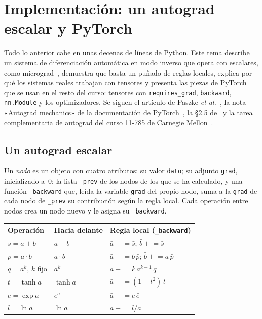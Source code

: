 \chapter{Implementación: un autograd escalar y PyTorch}
\label{tema:6}

Todo lo anterior cabe en unas decenas de líneas de Python. Este tema describe un sistema de diferenciación automática en modo inverso que opera con escalares, como micrograd~\cite{karpathy}, demuestra que basta un puñado de reglas locales, explica por qué los sistemas reales trabajan con tensores y presenta las piezas de PyTorch que se usan en el resto del curso: tensores con \texttt{requires\_grad}, \texttt{backward}, \texttt{nn.Module} y los optimizadores. Se siguen el artículo de Paszke \emph{et al.}~\cite{paszke}, la nota «Autograd mechanics» de la documentación de PyTorch~\cite{pytorch}, la §2.5 de~\cite{d2l} y la tarea complementaria de autograd del curso 11-785 de Carnegie Mellon~\cite{cmu11785}.

\section{Un autograd escalar}

\begin{definicion}\label{def:valor}
Un \emph{nodo} es un objeto con cuatro atributos: su valor \texttt{dato}; su adjunto \texttt{grad}, inicializado a~0; la lista \texttt{\_prev} de los nodos de los que se ha calculado, y una función \texttt{\_backward} que, leída la variable \texttt{grad} del propio nodo, suma a la \texttt{grad} de cada nodo de \texttt{\_prev} su contribución según la regla local. Cada operación entre nodos crea un nodo nuevo y le asigna su \texttt{\_backward}.
\end{definicion}

\begin{center}\small
\begin{tabular}{@{}lll@{}}
\toprule
Operación & Hacia delante & Regla local (\texttt{\_backward}) \\
\midrule
$s=a+b$ & $a+b$ & $\bar a\mathrel{+}=\bar s$; $\bar b\mathrel{+}=\bar s$ \\
$p=a\cdot b$ & $a\cdot b$ & $\bar a\mathrel{+}=b\,\bar p$; $\bar b\mathrel{+}=a\,\bar p$ \\
$q=a^{k}$, $k$ fijo & $a^{k}$ & $\bar a\mathrel{+}=k\,a^{k-1}\,\bar q$ \\
$t=\tanh a$ & $\tanh a$ & $\bar a\mathrel{+}=(1-t^{2})\,\bar t$ \\
$e=\exp a$ & $e^{a}$ & $\bar a\mathrel{+}=e\,\bar e$ \\
$l=\ln a$ & $\ln a$ & $\bar a\mathrel{+}=\bar l/a$ \\
\bottomrule
\end{tabular}
\end{center}

